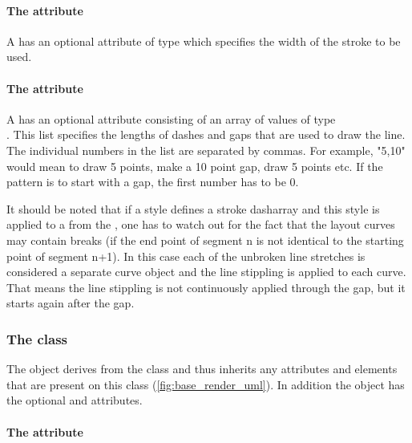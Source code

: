 \paragraph{The \fixttspace{} attribute}

A \GraphicalPrimitiveOneD has an optional attribute 
of type  which specifies the width of the stroke to be used.

\paragraph{The \fixttspace{} attribute}

A \GraphicalPrimitiveOneD has an optional attribute
 consisting of an array of values of type \\ . This list specifies the lengths of dashes and 
gaps that are used to draw the line. The individual numbers in the list are separated by commas. 
For example,  "5,10" would mean to draw 5 points, make a 10 point gap, draw 5 points etc. If the pattern is to start with a gap, the first number has to be 0.

It should be noted that if a style defines a stroke dasharray and this style is applied to a  from the \LayoutPackage, one has to watch out for the fact that the layout curves may contain breaks (if the end point of segment n is not identical to the starting point of segment n+1). In this case each of the unbroken line stretches is considered a separate curve object and the line stippling is applied to each curve. That means the line stippling is not continuously applied through the gap, but it starts again after the gap.


\subsubsection{The  class}
\label{graphicalprimitivetwod-class}

The \GraphicalPrimitiveTwoD object derives from the
\GraphicalPrimitiveOneD class and thus inherits any attributes and
elements that are present on this class (\ref{fig:base_render_uml}).
In addition the \GraphicalPrimitiveTwoD object has the optional  and  attributes.

\paragraph{The \fixttspace{} attribute}

